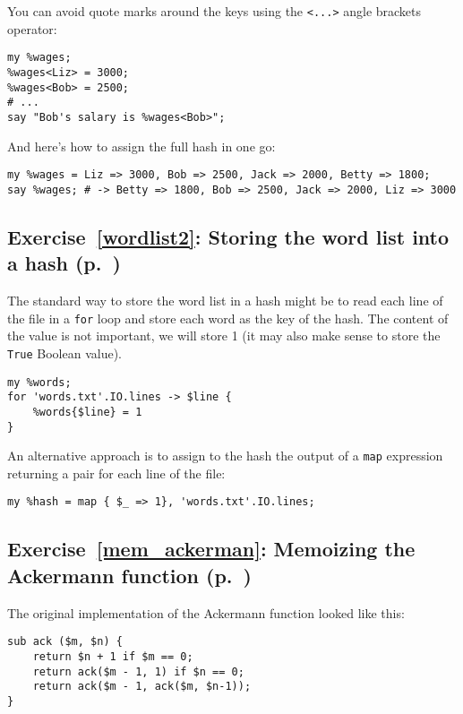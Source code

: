 You can avoid quote marks around the keys using 
the \verb'<...>' angle brackets operator:

\begin{verbatim}
my %wages;
%wages<Liz> = 3000;
%wages<Bob> = 2500;
# ...
say "Bob's salary is %wages<Bob>";
\end{verbatim}

And here's how to assign the full hash in one go:

\begin{verbatim}
my %wages = Liz => 3000, Bob => 2500, Jack => 2000, Betty => 1800;
say %wages; # -> Betty => 1800, Bob => 2500, Jack => 2000, Liz => 3000
\end{verbatim}

\subsection{Exercise~\ref{wordlist2}: Storing the word list into a hash (p.~\pageref{wordlist2})}
\label{sol_wordlist2}

The standard way to store the word list in a hash might 
be to read each line of the file in a {\tt for} loop 
and store each word as the key of the hash. The content 
of the value is not important, we will store 1 (it may 
also make sense to store the \verb'True' Boolean value).

\begin{verbatim}
my %words;
for 'words.txt'.IO.lines -> $line {
    %words{$line} = 1
}
\end{verbatim}

An alternative approach is to assign to the hash the 
output of a {\tt map} expression returning a pair for each 
line of the file:

\begin{verbatim}
my %hash = map { $_ => 1}, 'words.txt'.IO.lines;
\end{verbatim}
%

\subsection{Exercise~\ref{mem_ackerman}: Memoizing the Ackermann function (p.~\pageref{mem_ackerman})}
\label{sol_mem_ackerman}

The original implementation of the Ackermann function looked 
like this:

\begin{verbatim}
sub ack ($m, $n) {
    return $n + 1 if $m == 0;
    return ack($m - 1, 1) if $n == 0;
    return ack($m - 1, ack($m, $n-1));
}
\end{verbatim}

